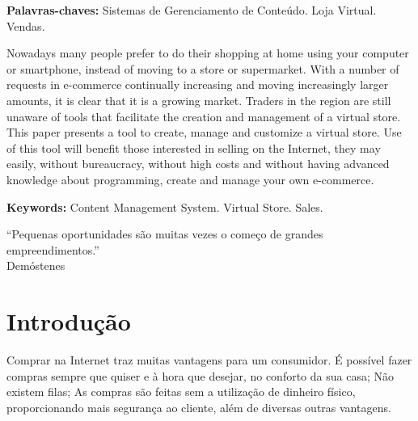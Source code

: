 \documentclass[a4paper,12pt]{monografia}
\renewcommand{\tablename}{Quadro}
\begin{document}
\noindent \textbf{Palavras-chaves:} Sistemas de Gerenciamento de Conteúdo. Loja Virtual. Vendas.

Nowadays many people prefer to do their shopping at home using your computer or smartphone, instead of moving to a store or supermarket. With a number of requests in e-commerce continually increasing and moving increasingly larger amounts, it is clear that it is a growing market. Traders in the region are still unaware of tools that facilitate the creation and management of a virtual store. This paper presents a tool to create, manage and customize a virtual store. Use of this tool will benefit those interested in selling on the Internet, they may easily, without bureaucracy, without high costs and without having advanced knowledge about programming, create and manage your own e-commerce.

\noindent \textbf{Keywords:} Content Management System. Virtual Store. Sales.
\newpage

\begin{epigrafe}
“Pequenas oportunidades são muitas vezes o começo de grandes empreendimentos.”\\
\hfill Demóstenes
\end{epigrafe}


{%
\let\oldnumberline\numberline%
\renewcommand{\numberline}{\figurename~\oldnumberline}%
\listoffigures%
\thispagestyle{empty}
}

\renewcommand\listtablename{Lista de Quadros}

{%
\let\oldnumberline\numberline%
\renewcommand{\numberline}{\tablename~\oldnumberline}%
\listoftables%
\thispagestyle{empty}
}

\tableofcontents
\thispagestyle{empty}
% 
\chapter{Introdução} %
\label{cha:intro}

Comprar na Internet traz muitas vantagens para um consumidor. É possível fazer compras sempre que quiser e à hora que desejar, no conforto da sua casa; Não existem filas; As compras são feitas sem a utilização de dinheiro físico, proporcionando mais segurança ao cliente, além de diversas outras vantagens.
\end{document}
